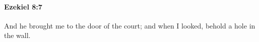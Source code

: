 
		\paragraph{Ezekiel 8:7} %
			\label{EZEKIEL-8-7}

			And he brought me to the door of the court; and when I looked, behold a hole in the wall.


